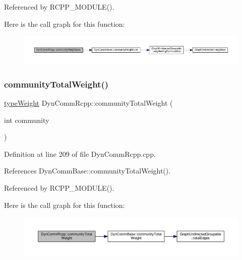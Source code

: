 Referenced by R\+C\+P\+P\+\_\+\+M\+O\+D\+U\+L\+E().

Here is the call graph for this function\+:
\nopagebreak
\begin{figure}[H]
\begin{center}
\leavevmode
\includegraphics[width=350pt]{classDynCommRcpp_ad23168e5fa7cf85d5508c646f3e39b9b_cgraph}
\end{center}
\end{figure}
\mbox{\label{classDynCommRcpp_a687e7be3ae84f1a80a3648435bd473a3}} 
\subsubsection{\texorpdfstring{community\+Total\+Weight()}{communityTotalWeight()}}
{\footnotesize\ttfamily \hyperlink{edge_8h_a2e7ea3be891ac8b52f749ec73fee6dd2}{type\+Weight} Dyn\+Comm\+Rcpp\+::community\+Total\+Weight (\begin{DoxyParamCaption}\item[{int}]{community }\end{DoxyParamCaption})\hspace{0.3cm}{\ttfamily [inline]}}



Definition at line 209 of file Dyn\+Comm\+Rcpp.\+cpp.



References Dyn\+Comm\+Base\+::community\+Total\+Weight().



Referenced by R\+C\+P\+P\+\_\+\+M\+O\+D\+U\+L\+E().

Here is the call graph for this function\+:
\nopagebreak
\begin{figure}[H]
\begin{center}
\leavevmode
\includegraphics[width=350pt]{classDynCommRcpp_a687e7be3ae84f1a80a3648435bd473a3_cgraph}
\end{center}
\end{figure}
\mbox{\label{classDynCommRcpp_ab856335d737d2292df6f86e9cf199d58}} 

